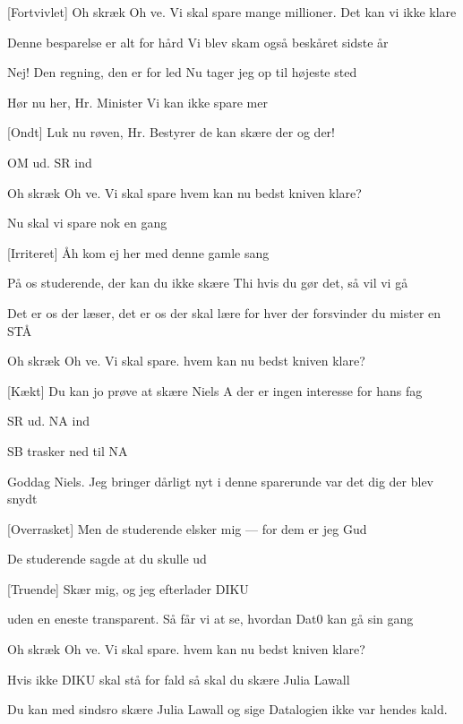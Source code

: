 \documentclass[a4paper]{article}
\begin{document}
\begin{song}
  [Fortvivlet]
  Oh skræk Oh ve. Vi skal spare mange
  millioner.
  Det kan vi ikke klare 

  Denne besparelse er alt for hård
  Vi blev skam også beskåret sidste år

   Nej! Den regning, den er for led
  Nu tager jeg op til højeste sted
  
  Hør nu her, Hr. Minister
  Vi kan ikke spare mer

  [Ondt]
  Luk nu røven, Hr. Bestyrer
  de kan skære der og der!

  \scene OM ud. SR ind
  
  Oh skræk Oh ve. Vi skal spare 
  hvem kan nu bedst kniven klare?

  Nu skal vi spare nok en gang
  
  [Irriteret]
  Åh kom ej her med denne gamle sang

  På os studerende, der kan du ikke skære
  Thi hvis du gør det, så vil vi gå

  Det er os der læser, det er os der skal lære
  for hver der forsvinder du mister en STÅ

  Oh skræk Oh ve. Vi skal spare.
  hvem kan nu bedst kniven klare?

  [Kækt]
  Du kan jo prøve at skære Niels A
  der er ingen interesse for hans fag

  \scene SR ud. NA ind

  \scene SB trasker ned til NA

  Goddag Niels. Jeg bringer dårligt nyt
  i denne sparerunde var det dig der blev snydt

  [Overrasket]
  Men de studerende elsker mig --- for dem er jeg Gud

  De studerende sagde at du skulle ud

  [Truende]
  Skær mig, og jeg efterlader DIKU

  uden en eneste transparent.
  Så får vi at se, hvordan Dat0 kan gå sin gang

  Oh skræk Oh ve. Vi skal spare.
  hvem kan nu bedst kniven klare?

  Hvis ikke DIKU skal stå for fald
  så skal du skære Julia Lawall

  Du kan med sindsro skære Julia Lawall 
  og sige Datalogien ikke var hendes kald.


\end{song}
\end{document}
